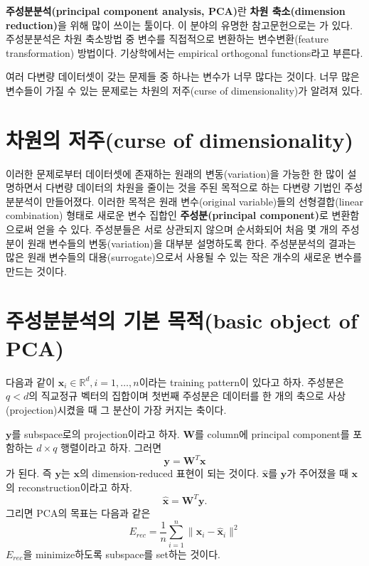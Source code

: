 \documentclass[b5paper,]{scrbook}
\theoremstyle{plain}
\theoremstyle{definition}
\numberwithin{equation}{section}
\begin{document}
\textbf{주성분분석(principal component analysis, PCA)}란 \textbf{차원 축소(dimension reduction)}을 위해 많이 쓰이는 툴이다. 이 분야의 유명한 참고문헌으로는 \citep{Jolliffe2002}가 있다. 주성분분석은 차원 축소방법 중 변수를 직접적으로 변환하는 변수변환(feature transformation) 방법이다. 기상학에서는 empirical orthogonal functions라고 부른다.

여러 다변량 데이터셋이 갖는 문제들 중 하나는 변수가 너무 많다는 것이다. 너무 많은 변수들이 가질 수 있는 문제로는 차원의 저주(curse of dimensionality)가 알려져 있다.

\hypertarget{-curse-of-dimensionality}{%
\section{차원의 저주(curse of dimensionality)}\label{-curse-of-dimensionality}}

이러한 문제로부터 데이터셋에 존재하는 원래의 변동(variation)을 가능한 한 많이 설명하면서 다변량 데이터의 차원을 줄이는 것을 주된 목적으로 하는 다변량 기법인 주성분분석이 만들어졌다. 이러한 목적은 원래 변수(original variable)들의 선형결합(linear combination) 형태로 새로운 변수 집합인 \textbf{주성분(principal component)}로 변환함으로써 얻을 수 있다. 주성분들은 서로 상관되지 않으며 순서화되어 처음 몇 개의 주성분이 원래 변수들의 변동(variation)을 대부분 설명하도록 한다. 주성분분석의 결과는 많은 원래 변수들의 대용(surrogate)으로서 사용될 수 있는 작은 개수의 새로운 변수를 만드는 것이다.

\hypertarget{--basic-object-of-pca}{%
\section{주성분분석의 기본 목적(basic object of PCA)}\label{--basic-object-of-pca}}

다음과 같이 \(\mathbf{x}_{i}\in\mathbb{R}^{d}, i=1,\ldots, n\)이라는 training pattern이 있다고 하자. 주성분은 \(q <d\)의 직교정규 벡터의 집합이며 첫번째 주성분은 데이터를 한 개의 축으로 사상(projection)시켰을 때 그 분산이 가장 커지는 축이다.

\(\mathbf{y}\)를 subspace로의 projection이라고 하자. \(\mathbf{W}\)를 column에 principal component를 포함하는 \(d\times q\) 행렬이라고 하자. 그러면
\[\mathbf{y}=\mathbf{W}^{T}\mathbf{x}\]
가 된다. 즉 \(\mathbf{y}\)는 \(\mathbf{x}\)의 dimension-reduced 표현이 되는 것이다. \(\hat{\mathbf{x}}\)를 \(\mathbf{y}\)가 주어졌을 때 \(\mathbf{x}\)의 reconstruction이라고 하자.
\[\hat{\mathbf{x}}=\mathbf{W}^{T}\mathbf{y}.\]
그리면 PCA의 목표는 다음과 같은
\[E_{rec}=\frac{1}{n}\sum_{i=1}^{n}\| \mathbf{x}_{i}-\hat{\mathbf{x}}_{i}\|^{2}\]
\(E_{rec}\)을 minimize하도록 subspace를 set하는 것이다.
\end{document}

